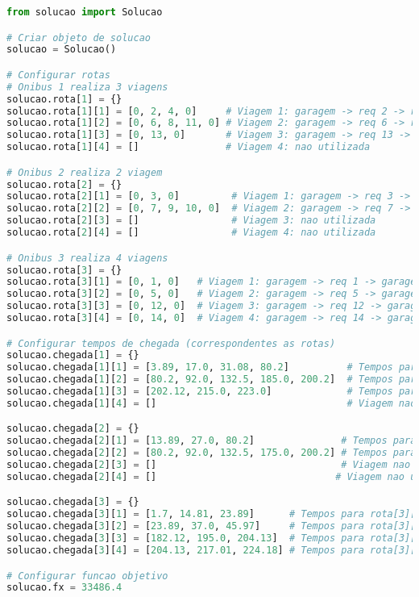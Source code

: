 \documentclass[12pt,a4paper]{article}
\begin{document}
\begin{lstlisting}[language=Python]
from solucao import Solucao

# Criar objeto de solucao
solucao = Solucao()

# Configurar rotas
# Onibus 1 realiza 3 viagens
solucao.rota[1] = {}
solucao.rota[1][1] = [0, 2, 4, 0]     # Viagem 1: garagem -> req 2 -> req 4 -> garagem
solucao.rota[1][2] = [0, 6, 8, 11, 0] # Viagem 2: garagem -> req 6 -> req 8 -> req 11 -> garagem
solucao.rota[1][3] = [0, 13, 0]       # Viagem 3: garagem -> req 13 -> garagem
solucao.rota[1][4] = []               # Viagem 4: nao utilizada

# Onibus 2 realiza 2 viagem
solucao.rota[2] = {}
solucao.rota[2][1] = [0, 3, 0]         # Viagem 1: garagem -> req 3 -> garagem
solucao.rota[2][2] = [0, 7, 9, 10, 0]  # Viagem 2: garagem -> req 7 -> req 9 -> req 10 -> garagem
solucao.rota[2][3] = []                # Viagem 3: nao utilizada
solucao.rota[2][4] = []                # Viagem 4: nao utilizada

# Onibus 3 realiza 4 viagens
solucao.rota[3] = {}
solucao.rota[3][1] = [0, 1, 0]   # Viagem 1: garagem -> req 1 -> garagem
solucao.rota[3][2] = [0, 5, 0]   # Viagem 2: garagem -> req 5 -> garagem
solucao.rota[3][3] = [0, 12, 0]  # Viagem 3: garagem -> req 12 -> garagem
solucao.rota[3][4] = [0, 14, 0]  # Viagem 4: garagem -> req 14 -> garagem

# Configurar tempos de chegada (correspondentes as rotas)
solucao.chegada[1] = {}
solucao.chegada[1][1] = [3.89, 17.0, 31.08, 80.2]          # Tempos para rota[1][1]
solucao.chegada[1][2] = [80.2, 92.0, 132.5, 185.0, 200.2]  # Tempos para rota[1][2]
solucao.chegada[1][3] = [202.12, 215.0, 223.0]             # Tempos para rota[1][3]
solucao.chegada[1][4] = []                                 # Viagem nao utilizada

solucao.chegada[2] = {}
solucao.chegada[2][1] = [13.89, 27.0, 80.2]               # Tempos para rota[2][1]
solucao.chegada[2][2] = [80.2, 92.0, 132.5, 175.0, 200.2] # Tempos para rota[2][2]
solucao.chegada[2][3] = []                                # Viagem nao utilizada
solucao.chegada[2][4] = []                               # Viagem nao utilizada

solucao.chegada[3] = {}
solucao.chegada[3][1] = [1.7, 14.81, 23.89]      # Tempos para rota[3][1]
solucao.chegada[3][2] = [23.89, 37.0, 45.97]     # Tempos para rota[3][2]
solucao.chegada[3][3] = [182.12, 195.0, 204.13]  # Tempos para rota[3][3]
solucao.chegada[3][4] = [204.13, 217.01, 224.18] # Tempos para rota[3][4]

# Configurar funcao objetivo
solucao.fx = 33486.4
\end{lstlisting}
\end{document}
